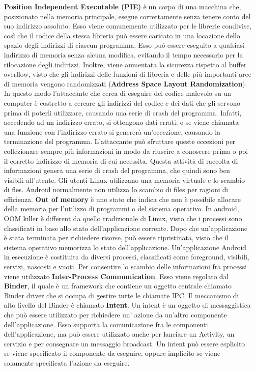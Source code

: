 \documentclass[12pt]{report}
\begin{document}
\textbf{Position Independent Executable (PIE)} è un corpo di una macchina che, posizionato nella memoria principale, esegue correttamente senza tenere conto del suo indirizzo assoluto. Esso viene comunemente utilizzato per le librerie condivise, così che il codice della stessa libreria può essere caricato in una locazione dello spazio degli indirizzi di ciascun programma. Esso può essere eseguito a qualsiasi indirizzo di memoria senza alcuna modifica, evitando il tempo necessario per la rilocazione degli indirizzi. Inoltre, viene aumentata la sicurezza rispetto al buffer overflow, visto che gli indirizzi delle funzioni di libreria e delle più importanti aree di memoria vengono randomizzati (\textbf{Address Space Layout Randomization}). In questo modo l'attaccante che cerca di eseguire del codice malevolo su un computer è costretto a cercare gli indirizzi del codice e dei dati che gli servono prima di poterli utilizzare, causando una serie di crash del programma. Infatti, accedendo ad un indirizzo errato, si ottengono dati errati, e se viene chiamata una funzione con l'indirizzo errato si genererà un'eccezione, causando la terminazione del programma. L'attaccante può sfruttare queste eccezioni per collezionare sempre più informazioni in modo da riuscire a conoscere prima o poi il corretto indirizzo di memoria di cui necessita. Questa attività di raccolta di informazioni genera una serie di crash del programma, che quindi sono ben visibili all'utente. Gli utenti Linux utilizzano una memoria virtuale e lo scambio di fles. Android normalmente non utilizza lo scambio di files per ragioni di efficienza. \textbf{Out of memory} è uno stato che indica che non è possibile allocare della memoria per l'utilizzo di programmi o del sistema operativo. In android, OOM killer è different da quello tradizionale di Linux, visto che i processi sono classificati in base allo stato dell'applicazione corrente. Dopo che un'applicazione è stata terminata per richiedere risorse, può essere ripristinata, visto che il sistema operativo memorizza lo stato dell'applicazione. Un'applicazione Android in esecuzione è costituita da diversi processi, classificati come foreground, visibili, servizi, nascosti e vuoti. Per consentire lo scambio delle informazioni fra processi viene utilizzato \textbf{Inter-Process Communication}. Esso viene regolato dal \textbf{Binder}, il quale è un framework che contiene un oggetto centrale chiamato Binder driver che si occupa di gestire tutte le chiamate IPC. Il meccanismo di alto livello del Binder è chiamato \textbf{Intent}. Un intent è un oggetto di messaggistica che può essere utilizzato per richiedere un' azione da un'altro componente dell'applicazione. Esso supporta la comunicazione fra le componenti dell'applicazione, ma può essere utilizzato anche per lanciare un Activity, un servizio e per consegnare un messaggio broadcast. Un intent può essere esplicito se viene specificato il componente da eseguire, oppure implicito se viene solamente specificata l'azione da eseguire.
\end{document}
